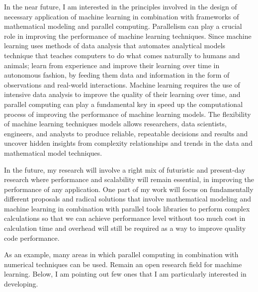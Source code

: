 \documentclass[a4paper, 11pt]{article}
\begin{document}
\begin{small}
In the near future, I am interested in the principles involved in the design of necessary application of machine learning in combination with frameworks of mathematical modeling and parallel computing.
Parallelism can play a crucial role in improving the performance of machine learning techniques. Since machine learning uses methods of data analysis that automates analytical 
models technique that teaches computers to do what comes naturally to humans and animals;
learn from experience and improve their learning over time in autonomous fashion, by feeding them data and information in the form of observations and real-world interactions.
Machine learning requires the use of intensive data analysis to improve the quality of their learning over time, and parallel computing can play a fundamental key in speed up
the computational process of improving the performance of machine learning models.
The flexibility of machine learning techniques models allows researchers, data scientists, engineers, and analysts to produce reliable, repeatable decisions and results and uncover 
hidden insights from complexity relationships and trends in the data and mathematical model  techniques\cite{Tarca_2007_Machine_Learning_Biology}.

In the future, my research will involve a right mix of futuristic and present-day research where performance and scalability will remain essential, in improving the performance of any application.
One part of my work will focus on fundamentally different proposals and radical solutions that involve mathematical modeling and machine learning in combination with parallel tools
libraries to perform complex calculations so that we can achieve performance level without too much cost in calculation time and overhead will still be required as a way to improve quality code performance.

As an example, many areas in which parallel computing in combination with numerical techniques can be used. Remain an open research field for machime learning. 
Below, I am pointing out few ones that I am particularly interested in developing.


\end{small}
\end{document}
